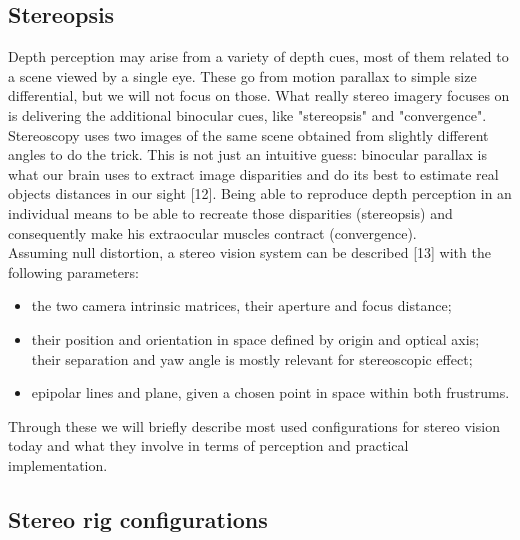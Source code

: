 \subsection{Stereopsis}
Depth perception may arise from a variety of depth cues, most of them related to a scene viewed by a single eye. These go from motion parallax to simple size differential, but we will not focus on those. What really stereo imagery focuses on is delivering the additional binocular cues, like "stereopsis" and "convergence". Stereoscopy uses two images of the same scene obtained from slightly different angles to do the trick. This is not just an intuitive guess: binocular parallax is what our brain uses to extract image disparities and do its best to estimate real objects distances in our sight [12]. Being able to reproduce depth perception in an individual means to be able to recreate those disparities (stereopsis) and consequently make his extraocular muscles contract (convergence).\\
Assuming null distortion, a stereo vision system can be described [13] with the following parameters:
\begin{itemize}
\item the two camera intrinsic matrices, their aperture and focus distance;
\item their position and orientation in space defined by origin and optical axis; their separation and yaw angle is mostly relevant for stereoscopic effect;
\item epipolar lines and plane, given a chosen point in space within both frustrums.
\end{itemize}
Through these we will briefly describe most used configurations for stereo vision today and what they involve in terms of perception and practical implementation.

\subsection{Stereo rig configurations}

